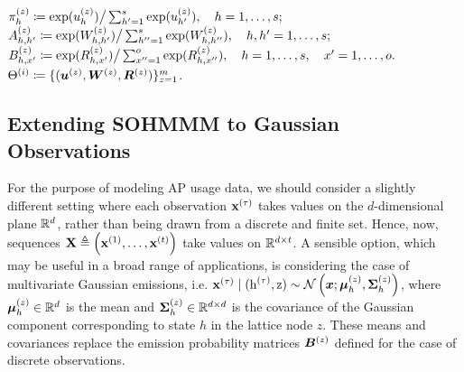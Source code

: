 \begin{algorithm}
\begin{algorithmic}[1]
		\vspace{0.3cm}
		\State ${\pi}_h^{(z)} \coloneqq \exp({u}_h^{(z)}) \big/ \sum_{h'=1}^{s}\exp({u}_{h'}^{(z)}), \quad h = 1, \dots, s;$
		\vspace{0.3cm}
		\State $ {A}^{(z)}_{h,h'} \coloneqq \exp({W}^{(z)}_{h,h'}) \big/ \sum_{h''=1}^{s} \exp({W}^{(z)}_{h,h''}), \quad h,h' = 1, \dots, s;$
		\vspace{0.3cm}
		\State ${B}^{(z)}_{h,x'} \coloneqq \exp({R}^{(z)}_{h,x'}) \big/ \sum_{x''=1}^{o} \exp({R}^{(z)}_{h,x''}), \quad h = 1, \dots, s, \quad x' = 1,\dots,o.$
		\vspace{0.3cm}
		\EndFor
		\vspace{0.3cm}
		\State $\Theta^{(i)} \coloneqq \lbrace ({\bm{u}}^{(z)}, {\bm{W}}^{(z)}, {\bm{R}}^{(z)}) \rbrace_{z=1}^m$.
		\vspace{0.3cm}
		\EndFor
		
	\end{algorithmic}
\end{algorithm}

\subsection{Extending SOHMMM to Gaussian Observations}
\label{sec:sohmmm_gaussian}

For the purpose of modeling AP usage data, we should consider a slightly different setting where each observation ${\mathbf{x}}^{(\tau)}$ takes values on the $d$-dimensional plane ${\mathbb{R}}^d$, rather than being drawn from a discrete and finite set. Hence, now, sequences ${\mathbf{X}} \triangleq \left({\mathbf{x}}^{(1)}, \dots, {\mathbf{x}}^{(t)} \right)$ take values on ${\mathbb{R}}^{d \times t}$. A sensible option, which may be useful in a broad range of applications, is considering the case of multivariate Gaussian emissions, i.e. ${\mathbf{x}}^{(\tau)} \mid ({\textnormal{h}}^{(\tau)}, {\textnormal{z}}) \sim \mathcal{N}\left({\bm{x}}; {\bm{\mu}}^{(z)}_h, {\bm{\Sigma}}^{(z)}_h\right)$, where ${\bm{\mu}}^{(z)}_h \in {\mathbb{R}}^d$ is the mean and ${\bm{\Sigma}}^{(z)}_h \in {\mathbb{R}}^{d \times d}$ is the covariance of the Gaussian component corresponding to state $h$ in the lattice node $z$. These means and covariances replace the emission probability matrices ${\bm{B}}^{(z)}$ defined for the case of discrete observations.

